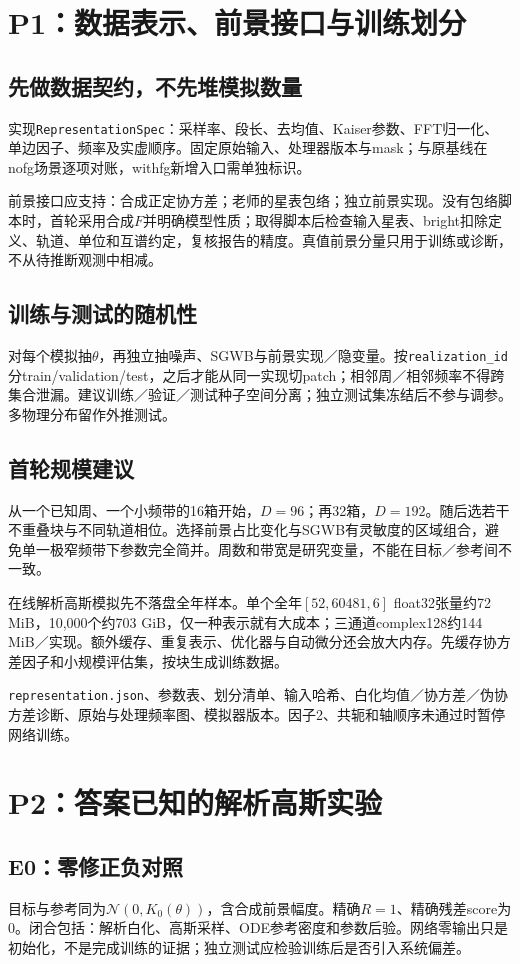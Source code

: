 \documentclass[UTF8,fontset=none,a4paper,11pt]{ctexart}
\newcommand{\code}[1]{\texttt{\nolinkurl{#1}}}
\begin{document}
\section{P1：数据表示、前景接口与训练划分}
\subsection{先做数据契约，不先堆模拟数量}
实现\code{RepresentationSpec}：采样率、段长、去均值、Kaiser参数、FFT归一化、单边因子、频率及实虚顺序。固定原始输入、处理器版本与mask；与原基线在nofg场景逐项对账，withfg新增入口需单独标识。

前景接口应支持：合成正定协方差；老师的星表包络；独立前景实现。没有包络脚本时，首轮采用合成$F$并明确模型性质；取得脚本后检查输入星表、bright扣除定义、轨道、单位和互谱约定，复核报告的精度。真值前景分量只用于训练或诊断，不从待推断观测中相减。
\subsection{训练与测试的随机性}
对每个模拟抽$\theta$，再独立抽噪声、SGWB与前景实现／隐变量。按\code{realization_id}分train/validation/test，之后才能从同一实现切patch；相邻周／相邻频率不得跨集合泄漏。建议训练／验证／测试种子空间分离；独立测试集冻结后不参与调参。多物理分布留作外推测试。
\subsection{首轮规模建议}
从一个已知周、一个小频带的16箱开始，$D=96$；再32箱，$D=192$。随后选若干不重叠块与不同轨道相位。选择前景占比变化与SGWB有灵敏度的区域组合，避免单一极窄频带下参数完全简并。周数和带宽是研究变量，不能在目标／参考间不一致。

在线解析高斯模拟先不落盘全年样本。单个全年$[52,60481,6]$ float32张量约72 MiB，10,000个约703 GiB，仅一种表示就有大成本；三通道complex128约144 MiB／实现。额外缓存、重复表示、优化器与自动微分还会放大内存。先缓存协方差因子和小规模评估集，按块生成训练数据。
\begin{keybox}[验收输出]
\code{representation.json}、参数表、划分清单、输入哈希、白化均值／协方差／伪协方差诊断、原始与处理频率图、模拟器版本。因子2、共轭和轴顺序未通过时暂停网络训练。
\end{keybox}
\clearpage

\section{P2：答案已知的解析高斯实验}
\subsection{E0：零修正负对照}
目标与参考同为$\mathcal N(0,K_0(\theta))$，含合成前景幅度。精确$R=1$、精确残差score为0。闭合包括：解析白化、高斯采样、ODE参考密度和参数后验。网络零输出只是初始化，不是完成训练的证据；独立测试应检验训练后是否引入系统偏差。
\end{document}
